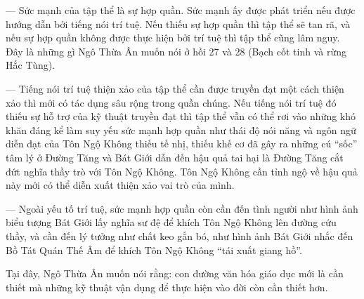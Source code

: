 — Sức mạnh của tập thể là sự hợp quần. Sức mạnh ấy được phát triển nếu được hướng dẫn bởi tiếng nói trí tuệ. Nếu thiếu sự hợp quần thì tập thể sẽ tan rã, và nếu sự hợp quần không được thực hiện bởi trí tuệ thì tập thể cũng lâm nguy. Đây là những gì Ngô Thừa Ân muốn nói ở hồi 27 và 28 (Bạch cốt tinh và rừng Hắc Tùng).

— Tiếng nói trí tuệ thiện xảo của tập thể cần được truyền đạt một cách thiện xảo thì mới có tác dụng sâu rộng trong quần chúng. Nếu tiếng nói trí tuệ đó thiếu sự hỗ trợ của kỹ thuật truyền đạt thì tập thể vẫn có thể rơi vào những khó khăn đáng kể làm suy yếu sức mạnh hợp quần như thái độ nói năng và ngôn ngữ diễn đạt của Tôn Ngộ Không thiếu tế nhị, thiếu khế cơ đã gây ra những cú ``sốc'' tâm lý ở Đường Tăng và Bát Giới dẫn đến hậu quả tai hại là Đường Tăng cắt đứt nghĩa thầy trò với Tôn Ngộ Không. Tôn Ngộ Không cần tỉnh ngộ về hậu quả này mới có thể diễn xuất thiện xảo vai trò của mình.

— Ngoài yếu tố trí tuệ, sức mạnh hợp quần còn cần đến tình người như hình ảnh biểu tượng Bát Giới lấy nghĩa sư đệ để khích Tôn Ngộ Không lên đường cứu thầy, và cần đến lý tưởng như chất keo gắn bó, như hình ảnh Bát Giới nhắc đến Bồ Tát Quán Thế Âm để khích Tôn Ngộ Không ``tái xuất giang hồ''.

Tại đây, Ngô Thừa Ân muốn nói rằng: con đường văn hóa giáo dục mới là cần thiết mà những kỹ thuật vận dụng để thực hiện vào đời còn cần thiết hơn.
